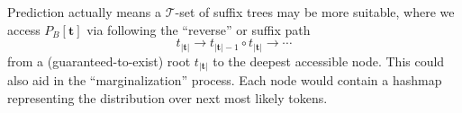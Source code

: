 \documentclass[11pt, oneside]{amsart}   	%
\begin{document}
Prediction actually means a $\mathcal{T}$-set of suffix trees may be more suitable, where we access $P_B[\mathbf{t}]$ via following the ``reverse'' or suffix path 
\begin{equation*}
	t_{|\mathbf{t}|} \rightarrow t_{|\mathbf{t}|-1} \circ t_{|\mathbf{t}|} \rightarrow \dotsb
\end{equation*}
from a (guaranteed-to-exist) root $t_{|\mathbf{t}|}$ to the deepest accessible node. This could also aid in the ``marginalization'' process. Each node would contain  a hashmap representing the distribution over next most likely tokens. 
\end{document}
